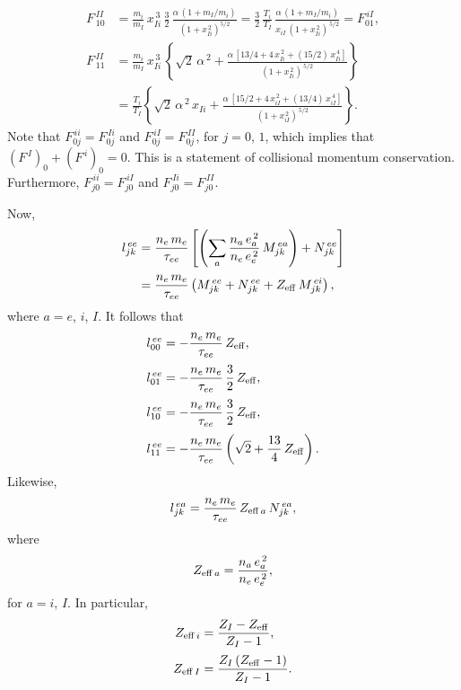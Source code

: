 \documentclass[notitlepage,12pt]{article}
\begin{document}
\begin{align}
F^{\,II}_{\,10}&=\frac{m_i}{m_I}\,x_{Ii}^{\,3}\,\frac{3}{2}\,\frac{\alpha\,(1+m_I/m_i)}{(1+x_{Ii}^{\,2})^{5/2}}=\frac{3}{2}\,\frac{T_i}{T_I}\,\frac{\alpha\,(1+m_I/m_i)}{x_{iI}\,(1+x_{Ii}^{\,2})^{\,5/2}}=F^{\,iI}_{01},\\[0.5ex]
F^{\,II}_{\,11}& =\frac{m_i}{m_I}\,x_{Ii}^{\,3}\,\left\{\sqrt{2}\,\alpha^{\,2}+
\frac{\alpha\,[13/4+4\,x_{Ii}^{\,2}+(15/2)\,x_{Ii}^{\,4}]}{(1+x_{Ii}^{\,2})^{\,5/2}}
\right\}\nonumber\\[0.5ex]
&=\frac{T_i}{T_I}\left\{\sqrt{2}\,\alpha^{\,2}\,x_{Ii} + \frac{\alpha\,[
15/2+4\,x_{iI}^{\,2}+(13/4)\,x_{iI}^{\,4}]}{(1+x_{iI}^{\,2})^{\,5/2}}\right\}.
\end{align}
Note that $F^{\,ii}_{0j}=F^{\,Ii}_{0j}$ and $F^{\,iI}_{0j}=F^{\,II}_{0j}$, for $j=0$, $1$, which implies
that $(F^{\,I})_0+(F^{\,i})_0= 0$. This is a statement of collisional momentum conservation.
Furthermore, $F^{\,ii}_{j0}=F^{\,iI}_{j0}$ and $F^{\,Ii}_{j0}=F^{\,II}_{j0}$. 

Now,
\begin{align}
l_{jk}^{\,ee} & = \frac{n_e\,m_e}{\tau_{ee}}\left[\left(\sum_a \frac{n_a\,e_a^{\,2}}{n_e\,e_e^{\,2}}\,M^{\,ea}_{jk}\right) + N^{\,ee}_{jk}\right]\\[0.5ex]
&= \frac{n_e\,m_e}{\tau_{ee}}\left(M^{\,ee}_{jk}+N^{\,ee}_{jk}+Z_{\rm eff}\,M^{\,ei}_{jk}\right),
\end{align}
where $a= e$, $i$, $I$. 
It follows that 
\begin{align}
l^{\,ee}_{00} &= -\frac{n_e\,m_e}{\tau_{ee}}\,Z_{\rm eff},\\[0.5ex]
l^{\,ee}_{01}&= -\frac{n_e\,m_e}{\tau_{ee}}\,\frac{3}{2}\,Z_{\rm eff},\\[0.5ex]
l^{\,ee}_{10}&= -\frac{n_e\,m_e}{\tau_{ee}}\,\frac{3}{2}\,Z_{\rm eff},\\[0.5ex]
l^{\,ee}_{11}& =- \frac{n_e\,m_e}{\tau_{ee}}\left(\sqrt{2} + \frac{13}{4}\,Z_{\rm eff}\right).
\end{align}
Likewise,
\begin{equation}
l_{jk}^{\,ea} = \frac{n_e\,m_e}{\tau_{ee}}\,Z_{{\rm eff}\,a}\,N^{\,ea}_{jk},
\end{equation}
where 
\begin{equation}
Z_{{\rm eff}\,a}= \frac{n_a\,e_a^{\,2}}{n_e\,e_e^{\,2}},
\end{equation}
 for $a=i$, $I$. In particular, 
 \begin{align}
Z_{{\rm eff}\,i}&=\frac{Z_I-Z_{\rm eff}}{Z_I-1},\\[0.5ex]
Z_{{\rm eff}\,I}&= \frac{Z_I\,(Z_{\rm eff}-1)}{Z_I-1}.
\end{align}
\end{document}
